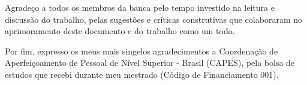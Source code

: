 \begin{agradecimentos}
\vspace{8pt}
Agradeço a todos os membros da banca pelo tempo investido na leitura e discussão do trabalho, pelas sugestões e críticas construtivas que colaboraram no aprimoramento deste documento e do trabalho como um todo.

\vspace{8pt}
Por fim, expresso os meus mais singelos agradecimentos a Coordenação de Aperfeiçoamento de Pessoal de Nível Superior - Brasil (CAPES), pela bolsa de estudos que recebi durante meu mestrado (Código de Financiamento 001).



    \begin{comment}

O presente trabalho foi realizado com apoio da Coordenação de Aperfeiçoamento de Pessoal de Nível Superior - Brasil (CAPES) - Código de Financiamento 001.
    \end{comment}


\end{agradecimentos}
